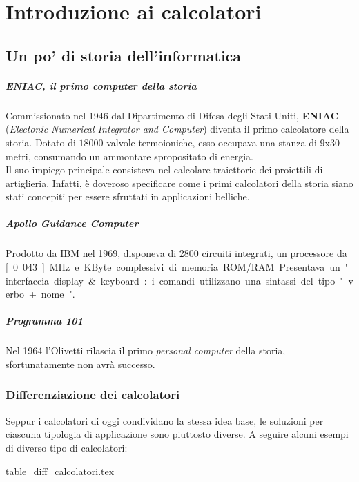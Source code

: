 \documentclass[class=book, crop=false]{standalone}
\begin{document}
\chapter{Introduzione ai calcolatori}
\section{Un po' di storia dell'informatica}
\paragraph{ENIAC, il primo computer della storia}
Commissionato nel 1946 dal Dipartimento di Difesa degli Stati Uniti, \textbf{ENIAC} (\emph{Electonic Numerical Integrator and Computer}) diventa il primo calcolatore della storia.
Dotato di $18000$ valvole termoioniche, esso occupava una stanza di 9x30 metri, consumando un ammontare spropositato di energia.\\
Il suo impiego principale consisteva nel calcolare traiettorie dei proiettili di artiglieria. Infatti, è doveroso specificare come i primi calcolatori della storia siano stati concepiti per essere sfruttati in applicazioni belliche.

\paragraph{Apollo Guidance Computer}
Prodotto da IBM nel 1969, disponeva di 2800 circuiti integrati, un processore da \unit[0.043]{MHz} e \unit[152]{KByte}  complessivi di memoria ROM/RAM. Presentava un'interfaccia display\&keyboard: i comandi utilizzano una sintassi del tipo "verbo + nome".

\paragraph{Programma 101} Nel 1964 l'Olivetti rilascia il primo \emph{personal computer} della storia, sfortunatamente non avrà successo.

\subsection{Differenziazione dei calcolatori}
Seppur i calcolatori di oggi condividano la stessa idea base, le soluzioni per ciascuna tipologia di applicazione sono piuttosto diverse. A seguire alcuni esempi di diverso tipo di calcolatori:

{table_diff_calcolatori.tex}
\end{document}
